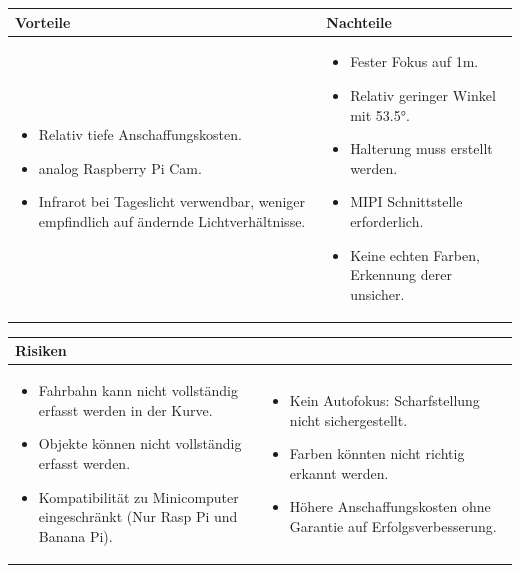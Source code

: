 \begin{table}[h]
\begin{tabular}{p{} | p{}}


 \textbf{Vorteile} & \textbf{Nachteile} \\ \hline
	 
\begin{itemize}
\item Relativ tiefe Anschaffungskosten.
\item analog Raspberry Pi Cam.
\item Infrarot bei Tageslicht verwendbar, weniger empfindlich auf ändernde Lichtverhältnisse.
\end{itemize}

 
 &
 
\begin{itemize}
\item Fester Fokus auf 1m.
\item Relativ geringer Winkel mit 53.5°.
\item Halterung muss erstellt werden.
\item MIPI Schnittstelle erforderlich.
\item Keine echten Farben, Erkennung derer unsicher.
\end{itemize}

\end{tabular}
\end{table}

\begin{table}[h]
\begin{tabular}{p{}p{}}


 \textbf{Risiken} & \\ \hline
	 
\begin{itemize}
\item Fahrbahn kann nicht vollständig erfasst werden in der Kurve.
\item Objekte können nicht vollständig erfasst werden.
\item Kompatibilität zu Minicomputer eingeschränkt (Nur Rasp Pi und Banana Pi).
\end{itemize}
&
\begin{itemize}
\item Kein Autofokus: Scharfstellung nicht sichergestellt.
\item Farben könnten nicht richtig erkannt werden.
\item Höhere Anschaffungskosten ohne Garantie auf Erfolgsverbesserung.
\end{itemize}

 
\end{tabular}
\end{table}

